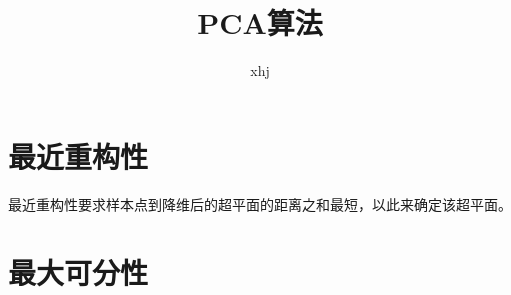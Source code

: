 \documentclass{article}
\author{xhj}
\title{PCA算法}
\begin{document}
\begin{CJK}{UTF8}{gkai}
\maketitle

\section{最近重构性}
最近重构性要求样本点到降维后的超平面的距离之和最短，以此来确定该超平面。
\section{最大可分性}
\end{CJK}
\end{document}

